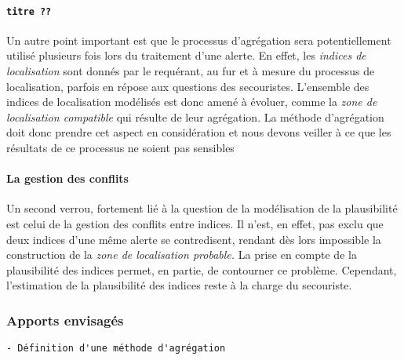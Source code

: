 \paragraph{\texttt{titre ??}}


Un autre point important est que le processus d'agrégation sera
potentiellement utilisé plusieurs fois lors du traitement d'une
alerte. En effet, les \emph{indices de localisation} sont donnés par
le requérant, au fur et à mesure du processus de localisation, parfois
en répose aux questions des secouristes. L'ensemble des indices de
localisation modélisés est donc amené à évoluer, comme la \emph{zone
  de localisation compatible} qui résulte de leur agrégation. La
méthode d’agrégation doit donc prendre cet aspect en considération et
nous devons veiller à ce que les résultats de ce processus ne soient
pas sensibles


\paragraph{La gestion des conflits}


Un second verrou, fortement lié à la question de la modélisation de la
plausibilité est celui de la gestion des conflits entre indices. Il
n'est, en effet, pas exclu que deux indices d'une même alerte se
contredisent, rendant dès lors impossible la construction de la
\emph{zone de localisation probable.} La prise en compte de la
plausibilité des indices permet, en partie, de contourner ce
problème. Cependant, l'estimation de la plausibilité des indices reste
à la charge du secouriste.

\subsubsection{Apports envisagés}

\begin{verbatim}
- Définition d'une méthode d'agrégation 
\end{verbatim}

